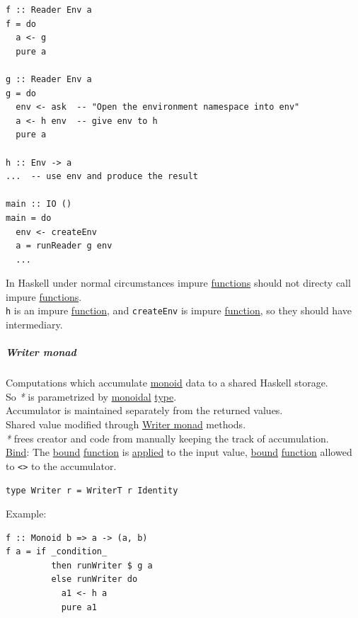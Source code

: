 \documentclass[a4paper,14pt,oneside]{book}
\begin{document}
{\begin{verbatim}
f :: Reader Env a
f = do
  a <- g
  pure a

g :: Reader Env a
g = do
  env <- ask  -- "Open the environment namespace into env"
  a <- h env  -- give env to h
  pure a

h :: Env -> a
...  -- use env and produce the result

main :: IO ()
main = do
  env <- createEnv
  a = runReader g env
  ...
\end{verbatim}

In Haskell under normal circumstances impure \hyperref[orgf33f5fb]{functions} should not directy call impure \hyperref[orgf33f5fb]{functions}.\\
\texttt{h} is an impure \hyperref[org6a60524]{function}, and \texttt{createEnv} is impure \hyperref[org6a60524]{function}, so they should have intermediary.\\

\subparagraph{\label{org78f045c}Writer monad}
\label{sec:orgb9560c7}
Computations which accumulate \hyperref[orgcf84af2]{monoid} data to a shared Haskell storage.\\
So \emph{*} is parametrized by \hyperref[orgaf25a8c]{monoidal} \hyperref[orga9ca243]{type}.\\

Accumulator is maintained separately from the returned values.\\

Shared value modified through \hyperref[org78f045c]{Writer monad} methods.\\

\emph{*} frees creator and code from manually keeping the track of accumulation.\\

\hyperref[orgdf51845]{Bind}: The \hyperref[orgda0d3e7]{bound} \hyperref[org6a60524]{function} is \hyperref[orgd497efc]{applied} to the input value, \hyperref[orgda0d3e7]{bound} \hyperref[org6a60524]{function} allowed to \texttt{<>} to the accumulator.\\

\begin{verbatim}
type Writer r = WriterT r Identity
\end{verbatim}

Example:\\
\begin{verbatim}
f :: Monoid b => a -> (a, b)
f a = if _condition_
         then runWriter $ g a
         else runWriter do
           a1 <- h a
           pure a1


\end{verbatim}}
\end{document}
